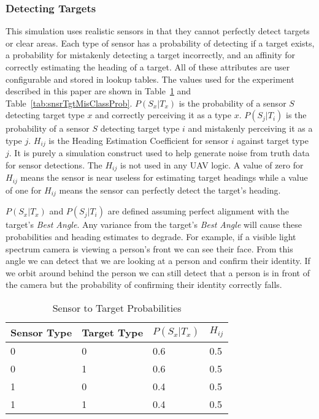 \subsubsection{Detecting Targets}
\label{sec:sensor_var_descriptions}
This simulation uses realistic sensors in that they cannot perfectly detect targets or clear areas.  Each type of sensor has a probability of detecting if a target exists, a probability for mistakenly detecting a target incorrectly, and an affinity for correctly estimating the heading of a target.  All of these attributes are user configurable and stored in lookup tables.  The values used for the experiment described in this paper are shown in Table~\ref{tab:snsrTgtProb} and Table~\ref{tab:snsrTgtMisClassProb}.  $P(S_{x}|T_{x})$ is the probability of a sensor $S$ detecting target type $x$ and correctly perceiving it as a type $x$.  $P(S_{j}|T_{i})$ is the probability of a sensor $S$ detecting target type $i$ and mistakenly perceiving it as a type $j$.  $H_{ij}$ is the Heading Estimation Coefficient for sensor $i$ against target type $j$.  It is purely a simulation construct used to help generate noise from truth data for sensor detections.  The $H_{ij}$ is not used in any UAV logic.  A value of zero for $H_{ij}$ means the sensor is near useless for estimating target headings while a value of one for $H_{ij}$ means the sensor can perfectly detect the target's heading.

$P(S_{x}|T_{x})$ and $P(S_{j}|T_{i})$ are defined assuming perfect alignment with the target's \textit{Best Angle}.  Any variance from the target's \textit{Best Angle} will cause these probabilities and heading estimates to degrade.  For example, if a visible light spectrum camera is viewing a person's front we can see their face.  From this angle we can detect that we are looking at a person and confirm their identity.  If we orbit around behind the person we can still detect that a person is in front of the camera but the probability of confirming their identity correctly falls.

\begin{table}[H]
	\caption{Sensor to Target Probabilities}
	\centering
	\label{tab:snsrTgtProb}
	\begin{tabular}{|p{1.2cm}|p{1.2cm}|p{1.5cm}|p{1cm}|}
		\hline
		Sensor Type & Target Type & $P(S_{x}|T_{x})$ & $H_{ij}$\\ \hline
		0 & 0 & 0.6 & 0.5 \\  \hline
		0 & 1 & 0.6 & 0.5 \\  \hline
		1 & 0 & 0.4 & 0.5 \\  \hline
		1 & 1 & 0.4 & 0.5 \\  \hline
	\end{tabular}
\end{table}

